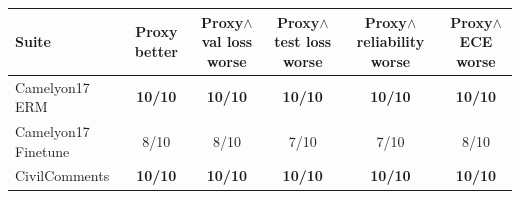 \begin{tabular}{lccccc}
  \toprule
  Suite & Proxy better & Proxy$\land$val loss worse & Proxy$\land$test loss worse & Proxy$\land$reliability worse & Proxy$\land$ECE worse \\
  \midrule
  Camelyon17 ERM & \textbf{10/10} & \textbf{10/10} & \textbf{10/10} & \textbf{10/10} & \textbf{10/10} \\
  Camelyon17 Finetune & 8/10 & 8/10 & 7/10 & 7/10 & 8/10 \\
  CivilComments & \textbf{10/10} & \textbf{10/10} & \textbf{10/10} & \textbf{10/10} & \textbf{10/10} \\
  \bottomrule
\end{tabular}

